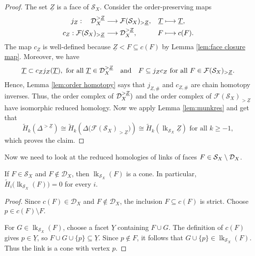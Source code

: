 \documentclass[a4paper,leqno]{amsart}
\begin{document}
\begin{proof}
The set $\underline{Z}$ is a face of $\mathcal S_X$. Consider the order-preserving maps
\begin{align*}
j_Z:\quad \mathcal D_X^{>\underline{Z}} &\longrightarrow\mathcal F(\mathcal S_X)_{>\underline{Z}},
&\underline{T}&\longmapsto \underline{T},\\
c_Z:\mathcal F(\mathcal S_X)_{>\underline{Z}}&\longrightarrow\mathcal D_X^{>\underline{Z}},
&F&\longmapsto c(F).
\end{align*}
The map $c_Z$ is well-defined because $\underline{Z}<F\subseteq c(F)$ by Lemma \ref{lem:face closure map}. Moreover, we have
\[
\underline{T}\subset c_Zj_Z(\underline{T}), \text{ for all $\underline{T}\in \mathcal D_X^{>\underline{Z}}$} \quad \text{and} \quad 
F\subseteq  j_Zc_Z \text{ for all $F\in\mathcal{F}(\mathcal{S}_X)_{>\underline{Z}}$.}
\]
Hence, Lemma \ref{lem:order homotopy} says that $j_{Z,\#}$ and $c_{Z,\#}$ are chain homotopy inverses. Thus, the order complex of $\mathcal D_X^{>\underline{Z}})$ and the order complex of $\mathcal F(\mathcal S_X)_{>\underline{Z}}$ have isomorphic reduced homology. Now we apply Lemma \ref{lem:munkres} and get that
\[
\widetilde{H}_k(\Delta^{>\underline{Z}}) 
\cong \widetilde{H}_k(\Delta\big(\mathcal{F}(\mathcal{S}_X)_{>\underline{Z}}\big)) 
\cong \widetilde{H}_k(\operatorname{lk}_{\mathcal{S}_X}{\underline{Z}}) \text{ for all }k\ge -1,
\]
which proves the claim.
\end{proof}

Now we need to look at the reduced homologies of links of faces $F\in \mathcal{S}_X\setminus \mathcal D_X$.

\begin{lem}\label{lem:bad face has 0 homology link}
If $F\in\mathcal S_X$ and $F\notin\mathcal D_X$, then $\operatorname{lk}_{\mathcal S_X}(F)$ is a cone. In particular, $\widetilde H_i\bigl(\operatorname{lk}_{\mathcal S_X}(F)\bigr)=0$ for every $i$.
\end{lem}

\begin{proof}
Since $c(F)\in\mathcal D_X$ and $F\notin\mathcal D_X$, the inclusion $F\subseteq c(F)$ is strict. Choose $p\in c(F)\setminus F$.

For $G\in\operatorname{lk}_{\mathcal S_X}(F)$, choose a facet $\underline{Y}$ containing $F\cup G$. The definition of $c(F)$ gives $p\in \underline{Y}$, so $F\cup G\cup\{p\}\subseteq \underline{Y}$. Since $p\notin F$, it follows that $G\cup\{p\}\in\operatorname{lk}_{\mathcal S_X}(F)$. Thus the link is a cone with vertex $p$.
\end{proof}
\end{document}
